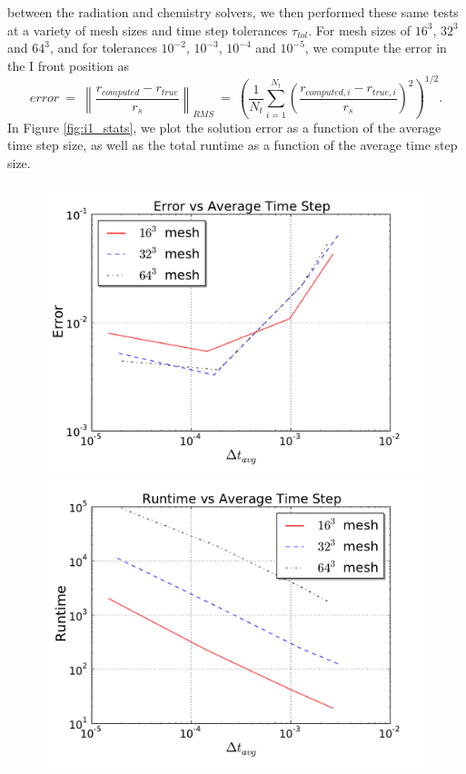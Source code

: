 between the radiation and chemistry solvers, we then performed these
same tests at a variety of mesh sizes and time step tolerances 
$\tau_{tol}$.  For mesh sizes of $16^3$, $32^3$ and $64^3$, and for
tolerances $10^{-2}$, $10^{-3}$, $10^{-4}$ and $10^{-5}$, we
compute the error in the I front position as
\begin{equation}
\label{eq:i1_error}
   error \ = \ \left\| \frac{r_{computed} - r_{true}}{r_s} \right\|_{RMS}
   \ = \ \left(\frac{1}{N_t} \sum_{i=1}^{N_t} \left(\frac{r_{computed,i} -
       r_{true,i}}{r_s}\right)^2 \right)^{1/2}.
\end{equation}
In Figure \ref{fig:i1_stats}, we plot the solution error as a function
of the average time step size, as well as the total runtime as a
function of the average time step size.  
\begin{figure}[t]
\centerline{\hfill
  \includegraphics[scale=0.45, trim=1.0cm 0.0cm 1.0cm 0.5cm]{i1-error_enzo.pdf}
  \includegraphics[scale=0.45, trim=1.0cm 0.0cm 1.0cm 0.5cm]{i1-runtime_enzo.pdf}
}
\end{figure}
